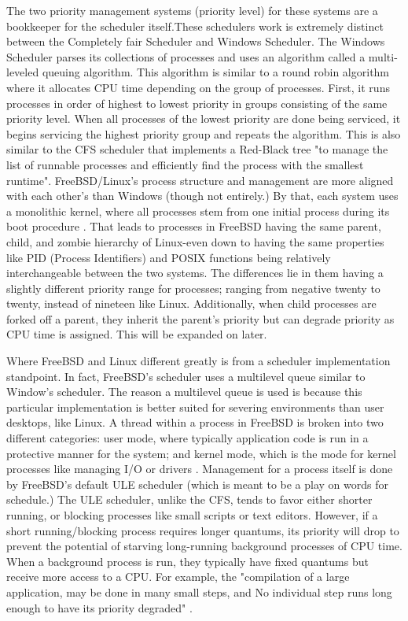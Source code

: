 \documentclass[letterpaper,10pt,titlepage]{IEEEtran}
\begin{document}
The two priority management systems (priority level) for these systems are a bookkeeper for the scheduler itself.These schedulers work is extremely distinct between the Completely fair Scheduler and Windows Scheduler. The Windows Scheduler parses its collections of processes and uses an algorithm called a multi-leveled queuing algorithm\cite{Scheduli20:online}. This algorithm is similar to a round robin algorithm where it allocates CPU time depending on the group of processes. First, it runs processes in order of highest to lowest priority in groups consisting of the same priority level. When all processes of the lowest priority are done being serviced, it begins servicing the highest priority group and repeats the algorithm. This  is also similar to the CFS scheduler that implements a Red-Black tree "to manage the list of runnable processes and efficiently find the process with the smallest runtime"\cite{love_2015}.
FreeBSD/Linux’s process structure and management are more aligned with each other's than Windows (though not entirely.) By that, each system uses a monolithic kernel, where all processes stem from one initial process during its boot procedure \cite{freeBsdBook}. That leads to  processes in FreeBSD having the same parent, child, and zombie hierarchy of Linux-even down to having the same properties like PID (Process Identifiers) and POSIX functions being relatively interchangeable between the two systems. The differences lie in them having a slightly different priority range for processes; ranging from negative twenty to twenty, instead of nineteen like Linux\cite{setprior86:online}. Additionally, when child processes are forked off a parent, they inherit the parent's priority but can degrade priority as CPU time is assigned. This will be expanded on later.

Where FreeBSD and Linux different greatly is from a scheduler implementation standpoint. In fact, FreeBSD's scheduler uses a multilevel queue\cite{ThreadSc37:online} similar to Window’s scheduler. The reason a multilevel queue is used is because this particular implementation is better suited for severing environments than user desktops, like Linux. A thread within a process in FreeBSD is broken into two different categories: user mode, where typically application code is run in a protective manner for the system; and kernel mode, which is the mode for kernel processes like managing I/O or drivers \cite{freeBsdBook}. Management for a process itself is done by FreeBSD’s default ULE scheduler (which is meant to be a play on words for schedule.) The ULE scheduler, unlike the CFS, tends to favor either shorter running, or blocking processes like small scripts or text editors. However, if a short running/blocking process requires longer quantums, its priority will drop to prevent the potential of starving long-running background processes of CPU time. When a background process is run, they typically have fixed quantums but receive more access to a CPU. For example, the "compilation of a large application, may be done in many small steps, and  No individual step runs long enough to have its priority degraded" \cite{freeBsdBook}.  
\end{document}
